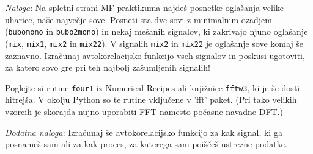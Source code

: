 \documentclass[slovene,11pt,a4paper]{article}
\begin{document}
\bigskip

{\it Naloga\/}: Na spletni strani MF praktikuma najdeš posnetke
oglašanja velike uharice, naše največje sove.  Posneti sta
dve sovi z minimalnim ozadjem ({\tt bubomono} in {\tt bubo2mono})
in nekaj mešanih signalov, ki zakrivajo njuno oglašanje
({\tt mix}, {\tt mix1}, {\tt mix2} in {\tt mix22}).
V signalih {\tt mix2} in {\tt mix22} je oglašanje sove
komaj še zaznavno.  Izračunaj avtokorelacijsko funkcijo 
vseh signalov in poskusi ugotoviti, za katero sovo gre
pri teh najbolj zašumljenih signalih!

Poglejte si rutine {\tt four1\/} iz Numerical Recipes
ali knjižnice {\tt fftw3}, ki je še dosti hitrejša. V okolju Python
so te rutine vključene v 'fft' paket. 
(Pri tako velikih vzorcih je skorajda nujno uporabiti FFT
namesto počasne navadne DFT.)

\bigskip

{\it Dodatna naloga\/}: Izračunaj še avtokorelacijsko funkcijo
za kak signal, ki ga posnameš sam ali za kak proces, za katerega
sam poiščeš ustrezne podatke.


\end{document}

